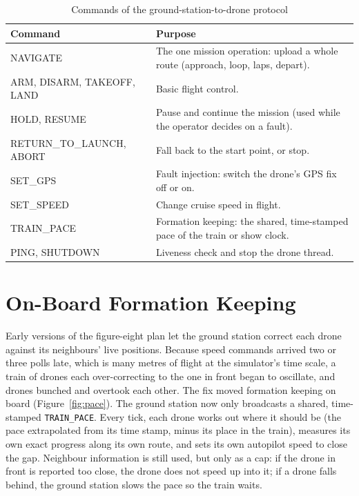 \documentclass[11pt,a4paper,oneside]{report}
\newcommand{\code}[1]{\texttt{#1}}
\begin{document}
\begin{table}[H]
\caption{Commands of the ground-station-to-drone protocol}\label{tab:commands}
\small
\begin{tabularx}{\textwidth}{@{}>{\ttfamily\footnotesize}P{0.28\textwidth}Y@{}}
\toprule
\textbf{\normalfont\small Command} & \textbf{Purpose} \\
\midrule
NAVIGATE & The one mission operation: upload a whole route (approach, loop, laps, depart). \\
ARM, DISARM, TAKEOFF, LAND & Basic flight control. \\
HOLD, RESUME & Pause and continue the mission (used while the operator decides on a fault). \\
RETURN\_TO\_LAUNCH, ABORT & Fall back to the start point, or stop. \\
SET\_GPS & Fault injection: switch the drone's GPS fix off or on. \\
SET\_SPEED & Change cruise speed in flight. \\
TRAIN\_PACE & Formation keeping: the shared, time-stamped pace of the train or show clock. \\
PING, SHUTDOWN & Liveness check and stop the drone thread. \\
\bottomrule
\end{tabularx}
\end{table}

\section{On-Board Formation Keeping}
Early versions of the figure-eight plan let the ground station correct each drone against its
neighbours' live positions. Because speed commands arrived two or three polls late, which is many
metres of flight at the simulator's time scale, a train of drones each over-correcting to the one
in front began to oscillate, and drones bunched and overtook each other. The fix moved formation
keeping on board (Figure~\ref{fig:pace}). The ground station now only broadcasts a shared,
time-stamped \code{TRAIN\_PACE}. Every tick, each drone works out where it should be (the pace
extrapolated from its time stamp, minus its place in the train), measures its own exact progress
along its own route, and sets its own autopilot speed to close the gap. Neighbour information is
still used, but only as a cap: if the drone in front is reported too close, the drone does not
speed up into it; if a drone falls behind, the ground station slows the pace so the train waits.
\end{document}
